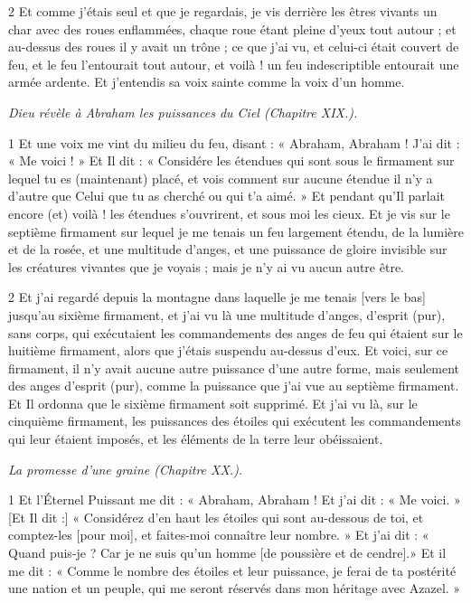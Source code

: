 \par 2 Et comme j'étais seul et que je regardais, je vis derrière les êtres vivants un char avec des roues enflammées, chaque roue étant pleine d'yeux tout autour ; et au-dessus des roues il y avait un trône ; ce que j'ai vu, et celui-ci était couvert de feu, et le feu l'entourait tout autour, et voilà ! un feu indescriptible entourait une armée ardente. Et j'entendis sa voix sainte comme la voix d'un homme.


\par \textit{Dieu révèle à Abraham les puissances du Ciel (Chapitre XIX.).}

\par 1 Et une voix me vint du milieu du feu, disant : « Abraham, Abraham ! J'ai dit : « Me voici ! » Et Il dit : « Considére les étendues qui sont sous le firmament sur lequel tu es (maintenant) placé, et vois comment sur aucune étendue il n’y a d’autre que Celui que tu as cherché ou qui t’a aimé. » Et pendant qu’Il ​​parlait encore (et) voilà ! les étendues s'ouvrirent, et sous moi les cieux. Et je vis sur le septième firmament sur lequel je me tenais un feu largement étendu, de la lumière et de la rosée, et une multitude d'anges, et une puissance de gloire invisible sur les créatures vivantes que je voyais ; mais je n'y ai vu aucun autre être.

\par 2 Et j'ai regardé depuis la montagne dans laquelle je me tenais [vers le bas] jusqu'au sixième firmament, et j'ai vu là une multitude d'anges, d'esprit (pur), sans corps, qui exécutaient les commandements des anges de feu qui étaient sur le huitième firmament, alors que j'étais suspendu au-dessus d'eux. Et voici, sur ce firmament, il n'y avait aucune autre puissance d'une autre forme, mais seulement des anges d'esprit (pur), comme la puissance que j'ai vue au septième firmament. Et Il ordonna que le sixième firmament soit supprimé. Et j'ai vu là, sur le cinquième firmament, les puissances des étoiles qui exécutent les commandements qui leur étaient imposés, et les éléments de la terre leur obéissaient.


\par \textit{La promesse d'une graine (Chapitre XX.).}

\par 1 Et l'Éternel Puissant me dit : « Abraham, Abraham ! Et j’ai dit : « Me voici. » [Et Il dit :] « Considérez d’en haut les étoiles qui sont au-dessous de toi, et comptez-les [pour moi], et faites-moi connaître leur nombre. » Et j’ai dit : « Quand puis-je ? Car je ne suis qu’un homme [de poussière et de cendre].» Et il me dit : « Comme le nombre des étoiles et leur puissance, je ferai de ta postérité une nation et un peuple, qui me seront réservés dans mon héritage avec Azazel. »

